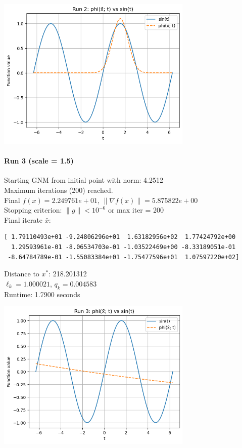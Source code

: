 \documentclass[12pt]{article}
\begin{document}
\includegraphics[width=0.7\textwidth]{figures/plot_7.png}

\paragraph{Run 3 (scale = 1.5)}
Starting GNM from initial point with norm: 4.2512\\
Maximum iterations (200) reached.\\
Final $f(x) = 2.249761e+01$, $\|\nabla f(x)\| = 5.875822e+00$\\
Stopping criterion: $\|g\| < 10^{-6}$ or max iter = 200\\
Final iterate $\bar{x}$:
\begin{verbatim}
[ 1.79110493e+01 -9.24806296e+01  1.63182956e+02  1.77424792e+00
  1.29593961e-01 -8.06534703e-01 -1.03522469e+00 -8.33189051e-01
 -8.64784789e-01 -1.55083384e+01 -1.75477596e+01  1.07597220e+02]
\end{verbatim}
Distance to $x^*$: 218.201312\\
$\ell_k = 1.000021$, $q_k = 0.004583$\\
Runtime: 1.7900 seconds

\includegraphics[width=0.7\textwidth]{figures/plot_8.png}
\end{document}

